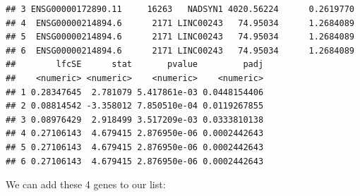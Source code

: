 \documentclass[9pt,a4paper,]{extarticle}
\newenvironment{Shaded}{\begin{snugshade}}{\end{snugshade}}
\newcommand{\KeywordTok}[1]{\textcolor[rgb]{0.13,0.29,0.53}{\textbf{#1}}}
\newcommand{\DataTypeTok}[1]{\textcolor[rgb]{0.13,0.29,0.53}{#1}}
\newcommand{\StringTok}[1]{\textcolor[rgb]{0.31,0.60,0.02}{#1}}
\newcommand{\OperatorTok}[1]{\textcolor[rgb]{0.81,0.36,0.00}{\textbf{#1}}}
\newcommand{\NormalTok}[1]{#1}
\begin{document}
\begin{verbatim}
## 3 ENSG00000172890.11     16263   NADSYN1 4020.56224      0.2619770
## 4  ENSG00000214894.6      2171 LINC00243   74.95034      1.2684089
## 5  ENSG00000214894.6      2171 LINC00243   74.95034      1.2684089
## 6  ENSG00000214894.6      2171 LINC00243   74.95034      1.2684089
##        lfcSE      stat       pvalue         padj
##    <numeric> <numeric>    <numeric>    <numeric>
## 1 0.28347645  2.781079 5.417861e-03 0.0448154406
## 2 0.08814542 -3.358012 7.850510e-04 0.0119267855
## 3 0.08976429  2.918499 3.517209e-03 0.0333810138
## 4 0.27106143  4.679415 2.876950e-06 0.0002442643
## 5 0.27106143  4.679415 2.876950e-06 0.0002442643
## 6 0.27106143  4.679415 2.876950e-06 0.0002442643
\end{verbatim}

We can add these 4 genes to our list:

\begin{Shaded}
\end{Shaded}
\end{document}
